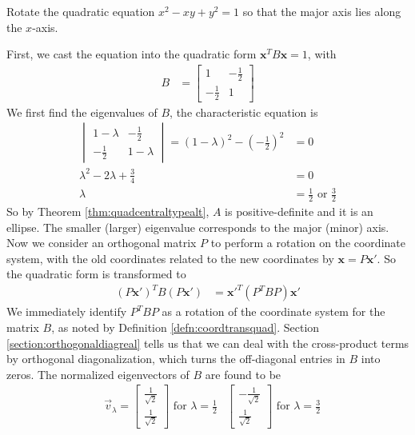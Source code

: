 \begin{exmp}
Rotate the quadratic equation $x^2 - xy + y^2 = 1$ so that the major axis lies along the $x$-axis.
\end{exmp}
First, we cast the equation into the quadratic form $\textbf{x}^T B\textbf{x} = 1$, with
\begin{align*}
B &=
\begin{bmatrix}
1 & -\frac{1}{2} \\
-\frac{1}{2} & 1
\end{bmatrix}
\end{align*}
We first find the eigenvalues of $B$, the characteristic equation is
\begin{align*}
\begin{vmatrix}
1-\lambda & -\frac{1}{2} \\
-\frac{1}{2} & 1-\lambda
\end{vmatrix} = (1-\lambda)^2 - (-\frac{1}{2})^2 &= 0 \\
\lambda^2 - 2\lambda + \frac{3}{4} &= 0 \\
\lambda &= \frac{1}{2} \text{ or } \frac{3}{2}
\end{align*}
So by Theorem \ref{thm:quadcentraltypealt}, $A$ is positive-definite and it is an ellipse. The smaller (larger) eigenvalue corresponds to the major (minor) axis. Now we consider an orthogonal matrix $P$ to perform a rotation on the coordinate system, with the old coordinates related to the new coordinates by $\textbf{x} = P\textbf{x}'$. So the quadratic form is transformed to
\begin{align*}
(P\textbf{x}')^T B (P\textbf{x}') &= \textbf{x}'^T (P^T BP) \textbf{x}'
\end{align*}
We immediately identify $P^T BP$ as a rotation of the coordinate system for the matrix $B$, as noted by Definition \ref{defn:coordtransquad}. Section \ref{section:orthogonaldiagreal} tells us that we can deal with the cross-product terms by orthogonal diagonalization, which turns the off-diagonal entries in $B$ into zeros. The normalized eigenvectors of $B$ are found to be
\begin{align*}
&\vec{v}_\lambda = \begin{bmatrix}
\frac{1}{\sqrt{2}} \\
\frac{1}{\sqrt{2}}
\end{bmatrix}
\text{ for } \lambda = \frac{1}{2}
& \begin{bmatrix}
-\frac{1}{\sqrt{2}} \\
\frac{1}{\sqrt{2}}
\end{bmatrix}
\text{ for } \lambda = \frac{3}{2}
\end{align*}
